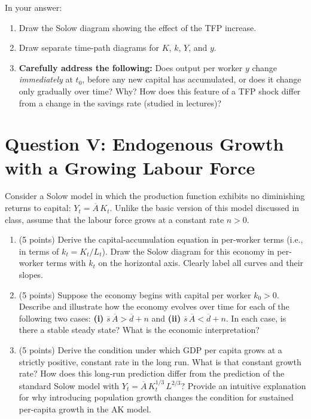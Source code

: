 \documentclass[letterpaper,12pt]{article}
\theoremstyle{dotlessS}
\begin{document}
In your answer:
\begin{enumerate}[label=(\roman*)]
\item Draw the Solow diagram showing the effect of the TFP increase.
\item Draw separate time-path diagrams for $K$, $k$, $Y$, and $y$.
\item \textbf{Carefully address the following:} Does output per worker $y$ change \textit{immediately} at $t_0$, before any new capital has accumulated, or does it change only gradually over time? Why? How does this feature of a TFP shock differ from a change in the savings rate (studied in lectures)?
\end{enumerate}


\section*{Question V: Endogenous Growth with a Growing Labour Force}
Consider a Solow model in which the production function exhibits no diminishing returns to capital: $Y_t = \overline{A}\,K_t$. Unlike the basic version of this model discussed in class, assume that the labour force grows at a constant rate $n > 0$.

\begin{enumerate}[label=(\alph*)]
\item (5 points) Derive the capital-accumulation equation in per-worker terms (i.e., in terms of $k_t = K_t/L_t$). Draw the Solow diagram for this economy in per-worker terms with $k_t$ on the horizontal axis. Clearly label all curves and their slopes.

\item (5 points) Suppose the economy begins with capital per worker $k_0 > 0$. Describe and illustrate how the economy evolves over time for each of the following two cases: \textbf{(i)} $\overline{s}\,\overline{A} > \overline{d} + n$ and \textbf{(ii)} $\overline{s}\,\overline{A} < \overline{d} + n$. In each case, is there a stable steady state? What is the economic interpretation?

\item (5 points) Derive the condition under which GDP per capita grows at a strictly positive, constant rate in the long run. What is that constant growth rate? How does this long-run prediction differ from the prediction of the standard Solow model with $Y_t = \overline{A}\,K_t^{1/3}\,L^{2/3}$? Provide an intuitive explanation for why introducing population growth changes the condition for sustained per-capita growth in the AK model.
\end{enumerate}
\end{document}
